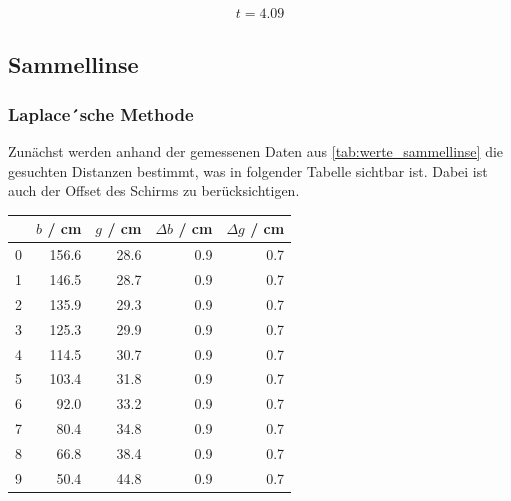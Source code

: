 \documentclass[11pt,ngerman]{scrartcl}
\begin{document}
\begin{align*}
	t = 4.09
\end{align*}

\newpage

\subsection{Sammellinse}

\subsubsection{Laplace´sche Methode}

Zunächst werden anhand der gemessenen Daten aus \autoref{tab:werte_sammellinse} die gesuchten Distanzen bestimmt, was in folgender Tabelle sichtbar ist. Dabei ist auch der Offset des Schirms zu berücksichtigen.

\begin{center}
	\begin{tabular}{lrrrr}
		\toprule
		{} & $b$ / cm & $g$ / cm & $\Delta b$ / cm & $\Delta g$ / cm \\
		\midrule
		0  & 156.6    & 28.6     & 0.9             & 0.7             \\
		1  & 146.5    & 28.7     & 0.9             & 0.7             \\
		2  & 135.9    & 29.3     & 0.9             & 0.7             \\
		3  & 125.3    & 29.9     & 0.9             & 0.7             \\
		4  & 114.5    & 30.7     & 0.9             & 0.7             \\
		5  & 103.4    & 31.8     & 0.9             & 0.7             \\
		6  & 92.0     & 33.2     & 0.9             & 0.7             \\
		7  & 80.4     & 34.8     & 0.9             & 0.7             \\
		8  & 66.8     & 38.4     & 0.9             & 0.7             \\
		9  & 50.4     & 44.8     & 0.9             & 0.7             \\
		\bottomrule
	\end{tabular}
\end{center}
\end{document}

